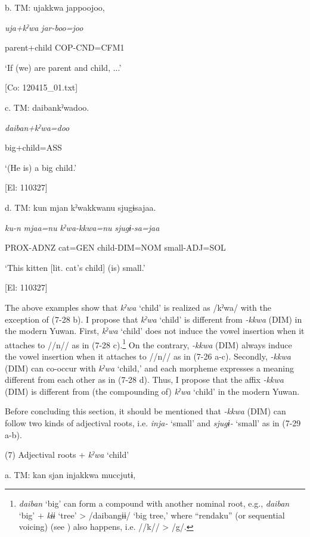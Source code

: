   b.  TM:  ujakkwa  jappoojoo,

      \textit{uja+kˀwa}  \textit{jar-boo=joo}

      parent+child  COP-CND=CFM1

      ‘If (we) are parent and child, ...’

      [Co: 120415\_01.txt]

  c.  TM:  daibankˀwadoo.

      \textit{daiban+kˀwa=doo}

      big+child=ASS

      ‘(He is) a big child.’

      [El: 110327]

  d.  TM:  kun  mjan  kˀwakkwanu  sjugɨsajaa.

      \textit{ku-n}  \textit{mjaa=nu}  \textit{kˀwa-kkwa=nu}  \textit{sjugɨ-sa=jaa}

      PROX-ADNZ  cat=GEN  child-DIM=NOM  small-ADJ=SOL

      ‘This kitten [lit. cat’s child] (is) small.’

      [El: 110327]

The above examples show that \textit{kˀwa} ‘child’ is realized as /kˀwa/ with the exception of (7-28 b). I propose that \textit{kˀwa} ‘child’ is different from \textit{{}-kkwa} (DIM) in the modern Yuwan. First, \textit{kˀwa} ‘child’ does not induce the vowel insertion when it attaches to //n// as in (7-28 c).\footnote{\textit{daiban} ‘big’ can form a compound with another nominal root, e.g., \textit{daiban} ‘big’ + \textit{kɨɨ} ‘tree’ > /daibangɨɨ/ ‘big tree,’ where “rendaku” (or sequential voicing) (see ) also happens, i.e. //k// > /g/.} On the contrary, \textit{{}-kkwa} (DIM) always induce the vowel insertion when it attaches to //n// as in (7-26 a-c). Secondly, \textit{{}-kkwa} (DIM) can co-occur with \textit{kˀwa} ‘child,’ and each morpheme expresses a meaning different from each other as in (7-28 d). Thus, I propose that the affix \textit{{}-kkwa} (DIM) is different from (the compounding of) \textit{kˀwa} ‘child’ in the modern Yuwan.

  Before concluding this section, it should be mentioned that \textit{{}-kkwa} (DIM) can follow two kinds of adjectival roots, i.e. \textit{inja-} ‘small’ and \textit{sjugɨ-} ‘small’ as in (7-29 a-b).

(7)  Adjectival roots + \textit{kˀwa} ‘child’

  a.  TM:  kan  sjan  injakkwa  muccjutɨ,

